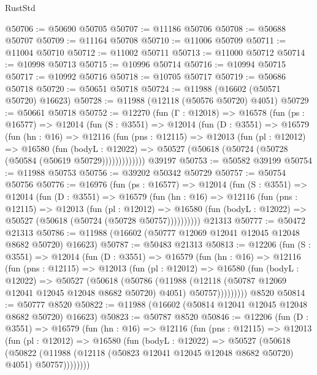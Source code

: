 \begin{lexlean}{RustStd}
\begin{coremodule}
@50706 := @50690 @50705
@50707 := @11186 @50706
@50708 := @50688 @50707
@50709 := @11164 @50708
@50710 := @11006 @50709
@50711 := @11004 @50710
@50712 := @11002 @50711
@50713 := @11000 @50712
@50714 := @10998 @50713
@50715 := @10996 @50714
@50716 := @10994 @50715
@50717 := @10992 @50716
@50718 := @10705 @50717
@50719 := @50686 @50718
@50720 := @50651 @50718
@50724 := @11988 (@16602 (@50571 @50720) @16623)
@50728 := @11988 (@12118 (@50576 @50720) @4051)
@50729 := @50661 @50718
@50752 := @12270
    (fun (Γ : @12018) =>
    @16578
      (fun (ps : @16577) =>
      @12014
        (fun (S : @3551) =>
        @12014
          (fun (D : @3551) =>
          @16579
            (fun (hn : @16) =>
            @12116
              (fun (pns : @12115) =>
              @12013
                (fun (pl : @12012) =>
                @16580
                  (fun (bodyL : @12022) =>
                  @50527 (@50618 (@50724 (@50728 (@50584 (@50619 @50729)))))))))))))
    @39197
@50753 := @50582 @39199
@50754 := @11988 @50753
@50756 := @39202 @50342 @50729
@50757 := @50754 @50756
@50776 := @16976
    (fun (ps : @16577) =>
    @12014
      (fun (S : @3551) =>
      @12014
        (fun (D : @3551) =>
        @16579
          (fun (hn : @16) =>
          @12116
            (fun (pns : @12115) =>
            @12013
              (fun (pl : @12012) =>
              @16580 (fun (bodyL : @12022) => @50527 (@50618 (@50724 (@50728 @50757))))))))))
    @21313
@50777 := @50472 @21313
@50786 := @11988 (@16602 (@50777 @12069 @12041 @12045 @12048 @8682 @50720) @16623)
@50787 := @50483 @21313
@50813 := @12206
    (fun (S : @3551) =>
    @12014
      (fun (D : @3551) =>
      @16579
        (fun (hn : @16) =>
        @12116
          (fun (pns : @12115) =>
          @12013
            (fun (pl : @12012) =>
            @16580
              (fun (bodyL : @12022) =>
              @50527
                (@50618
                  (@50786
                    (@11988
                      (@12118 (@50787 @12069 @12041 @12045 @12048 @8682 @50720) @4051)
                      @50757)))))))))
    @8520
@50814 := @50777 @8520
@50822 := @11988 (@16602 (@50814 @12041 @12045 @12048 @8682 @50720) @16623)
@50823 := @50787 @8520
@50846 := @12206
    (fun (D : @3551) =>
    @16579
      (fun (hn : @16) =>
      @12116
        (fun (pns : @12115) =>
        @12013
          (fun (pl : @12012) =>
          @16580
            (fun (bodyL : @12022) =>
            @50527
              (@50618
                (@50822
                  (@11988 (@12118 (@50823 @12041 @12045 @12048 @8682 @50720) @4051) @50757))))))))

\end{coremodule}
\end{lexlean}
